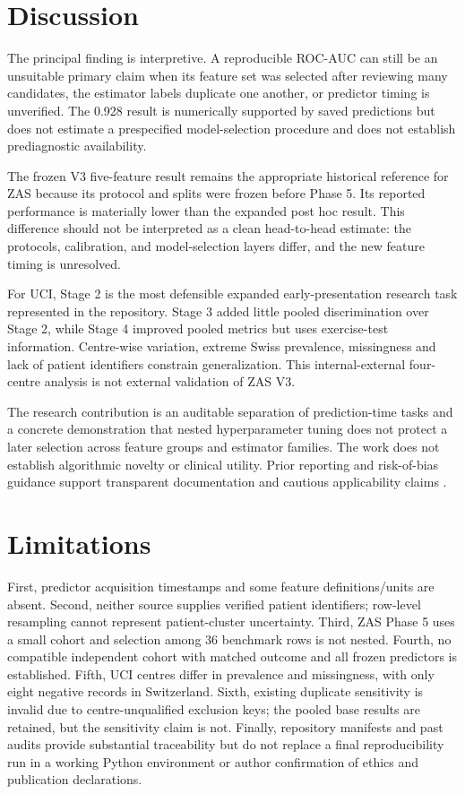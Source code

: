 \documentclass[11pt]{article}
\begin{document}
\section{Discussion}
The principal finding is interpretive. A reproducible ROC-AUC can still be an unsuitable primary claim when its feature set was selected after reviewing many candidates, the estimator labels duplicate one another, or predictor timing is unverified. The 0.928 result is numerically supported by saved predictions but does not estimate a prespecified model-selection procedure and does not establish prediagnostic availability.

The frozen V3 five-feature result remains the appropriate historical reference for ZAS because its protocol and splits were frozen before Phase 5. Its reported performance is materially lower than the expanded post hoc result. This difference should not be interpreted as a clean head-to-head estimate: the protocols, calibration, and model-selection layers differ, and the new feature timing is unresolved.

For UCI, Stage 2 is the most defensible expanded early-presentation research task represented in the repository. Stage 3 added little pooled discrimination over Stage 2, while Stage 4 improved pooled metrics but uses exercise-test information. Centre-wise variation, extreme Swiss prevalence, missingness and lack of patient identifiers constrain generalization. This internal-external four-centre analysis is not external validation of ZAS V3.

The research contribution is an auditable separation of prediction-time tasks and a concrete demonstration that nested hyperparameter tuning does not protect a later selection across feature groups and estimator families. The work does not establish algorithmic novelty or clinical utility. Prior reporting and risk-of-bias guidance support transparent documentation and cautious applicability claims \citep{tripodAI,probastAI}.

\section{Limitations}
First, predictor acquisition timestamps and some feature definitions/units are absent. Second, neither source supplies verified patient identifiers; row-level resampling cannot represent patient-cluster uncertainty. Third, ZAS Phase 5 uses a small cohort and selection among 36 benchmark rows is not nested. Fourth, no compatible independent cohort with matched outcome and all frozen predictors is established. Fifth, UCI centres differ in prevalence and missingness, with only eight negative records in Switzerland. Sixth, existing duplicate sensitivity is invalid due to centre-unqualified exclusion keys; the pooled base results are retained, but the sensitivity claim is not. Finally, repository manifests and past audits provide substantial traceability but do not replace a final reproducibility run in a working Python environment or author confirmation of ethics and publication declarations.
\end{document}
